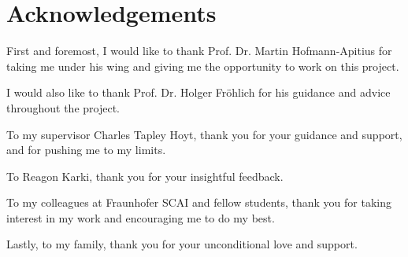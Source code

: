 \chapter*{Acknowledgements}

First and foremost, I would like to thank Prof. Dr. Martin Hofmann-Apitius for taking me under his wing and giving me the opportunity to work on this project.

I would also like to thank Prof. Dr. Holger Fröhlich for his guidance and advice throughout the project.

To my supervisor Charles Tapley Hoyt, thank you for your guidance and support, and for pushing me to my limits.

To Reagon Karki, thank you for your insightful feedback.

To my colleagues at Fraunhofer SCAI and fellow students, thank you for taking interest in my work and encouraging me to do my best.

Lastly, to my family, thank you for your unconditional love and support.
